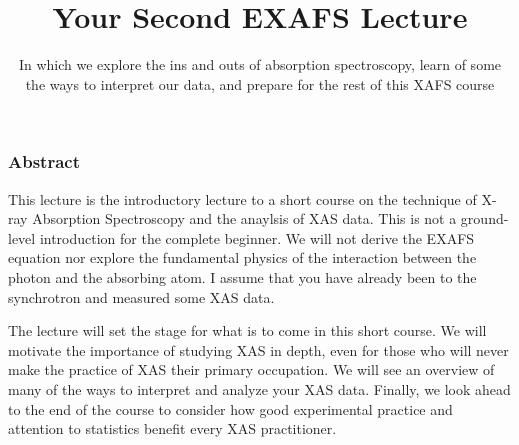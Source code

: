 \documentclass[10pt, xcolor=x11names, compress]{beamer}
\title{Your Second EXAFS Lecture}%
\subtitle{In which we explore the ins and outs of absorption
  spectroscopy, learn of some the ways to interpret our data, and
  prepare for the rest of this XAFS course}
\begin{document}
\maketitle


\begin{frame}
  \frametitle{Abstract}
  This lecture is the introductory lecture to a short course on the
  technique of X-ray Absorption Spectroscopy and the anaylsis of XAS
  data.  This is not a ground-level introduction for the complete
  beginner.  We will not derive the EXAFS equation nor explore the
  fundamental physics of the interaction between the photon and the
  absorbing atom.  I assume that you have already been to the
  synchrotron and measured some XAS data.

  \medskip

  The lecture will set the stage for what is to come in this short
  course.  We will motivate the importance of studying XAS in depth,
  even for those who will never make the practice of XAS their primary
  occupation.  We will see an overview of many of the ways to
  interpret and analyze your XAS data.  Finally, we look ahead to the
  end of the course to consider how good experimental practice and
  attention to statistics benefit every XAS practitioner.
\end{frame}
\end{document}
